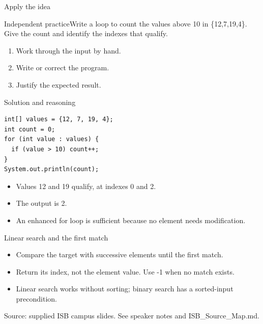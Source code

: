 \documentclass[10pt,aspectratio=169]{beamer}
\begin{document}
\begin{frame}[fragile,t]{Apply the idea}
\begin{alertblock}{Independent practice}Write a loop to count the values above 10 in \{12,7,19,4\}. Give the count and identify the indexes that qualify.\end{alertblock}\vspace{3mm}\begin{enumerate}\item Work through the input by hand.\item Write or correct the program.\item Justify the expected result.\end{enumerate}
\end{frame}

\begin{frame}[fragile,t]{Solution and reasoning}
\begin{lstlisting}
int[] values = {12, 7, 19, 4};
int count = 0;
for (int value : values) {
  if (value > 10) count++;
}
System.out.println(count);
\end{lstlisting}\vspace{1mm}\small\begin{itemize}
\item Values 12 and 19 qualify, at indexes 0 and 2.
\item The output is 2.
\item An enhanced for loop is sufficient because no element needs modification.
\end{itemize}
\end{frame}

\begin{frame}[fragile,t]{Linear search and the first match}
\begin{itemize}
\item Compare the target with successive elements until the first match.
\item Return its index, not the element value. Use {-}1 when no match exists.
\item Linear search works without sorting; binary search has a sorted{-}input precondition.
\end{itemize}
\vspace{3mm}\footnotesize\textcolor{accent}{Source: supplied ISB campus slides. See speaker notes and ISB\_Source\_Map.md.}
\end{frame}
\end{document}
